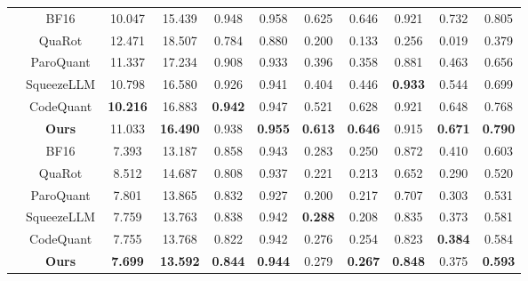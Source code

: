\documentclass{article}
\begin{document}
\begin{table}[!t]
{\begin{tabular}{c|c|cc|cccccc|c}
    & BF16       & 10.047 & 15.439 & 0.948 & 0.958 & 0.625 & 0.646 & 0.921 & 0.732 & 0.805 \\
    & QuaRot     & 12.471 & 18.507 & 0.784 & 0.880 & 0.200 & 0.133 & 0.256 & 0.019 & 0.379 \\
    & ParoQuant  & 11.337 & 17.234 & 0.908 & 0.933 & 0.396 & 0.358 & 0.881 & 0.463 & 0.656 \\
    & SqueezeLLM & 10.798 & 16.580 & 0.926 & 0.941 & 0.404 & 0.446 & \textbf{0.933} & 0.544 & 0.699 \\
    & CodeQuant  & \textbf{10.216} & 16.883 & \textbf{0.942} & 0.947 & 0.521 & 0.628 & 0.921 & 0.648 & 0.768 \\
    & \textbf{Ours}
                 & 11.033
                 & \textbf{16.490}
                 & 0.938
                 & \textbf{0.955}
                 & \textbf{0.613}
                 & \textbf{0.646}
                 & 0.915
                 & \textbf{0.671}
                 & \textbf{0.790} \\

    \cmidrule(lr){1-11}
    
    & BF16       & 7.393 & 13.187 & 0.858 & 0.943 & 0.283 & 0.250 & 0.872 & 0.410 & 0.603 \\
    & QuaRot     & 8.512 & 14.687 & 0.808 & 0.937 & 0.221 & 0.213 & 0.652 & 0.290 & 0.520 \\
    & ParoQuant  & 7.801 & 13.865 & 0.832 & 0.927 & 0.200 & 0.217 & 0.707 & 0.303 & 0.531 \\
    & SqueezeLLM & 7.759 & 13.763 & 0.838 & 0.942 & \textbf{0.288} & 0.208 & 0.835 & 0.373 & 0.581 \\
    & CodeQuant  & 7.755 & 13.768 & 0.822 & 0.942 & 0.276 & 0.254 & 0.823 & \textbf{0.384} & 0.584 \\
    & \textbf{Ours}
                 & \textbf{7.699}
                 & \textbf{13.592}
                 & \textbf{0.844}
                 & \textbf{0.944}
                 & 0.279
                 & \textbf{0.267}
                 & \textbf{0.848}
                 & 0.375
                 & \textbf{0.593} \\
    
    \bottomrule
            
\end{tabular}
}
\label{tab:eval:acc_a8w4}
\end{table}
\end{document}
